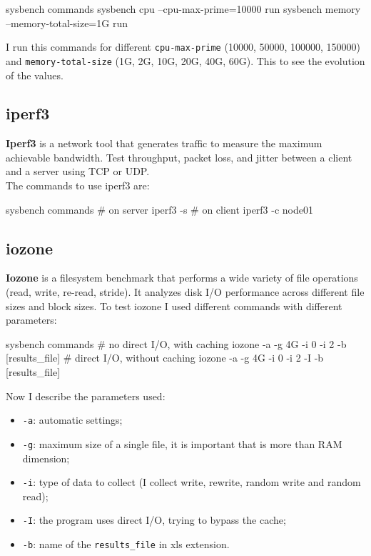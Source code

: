 \begin{codice}[style=bashstyle]{sysbench commands}
    sysbench cpu --cpu-max-prime=10000 run
    sysbench memory --memory-total-size=1G run
\end{codice}

I run this commands for different \texttt{cpu-max-prime} (10000, 50000, 100000, 150000) and \texttt{memory-total-size} (1G, 2G, 10G, 20G, 40G, 60G). This to see the evolution of the values.
\subsection{iperf3}
\textbf{Iperf3} is a network tool that generates traffic to measure the maximum achievable bandwidth. Test throughput, packet loss, and jitter between a client and a server using TCP or UDP. \\
The commands to use iperf3 are:

\begin{codice}[style=bashstyle]{sysbench commands}
    # on server
    iperf3 -s
    # on client
    iperf3 -c node01
\end{codice}

\subsection{iozone}
\textbf{Iozone} is a filesystem benchmark that performs a wide variety of file operations (read, write, re-read, stride). It analyzes disk I/O performance across different file sizes and block sizes.
To test iozone I used different commands with different parameters:

\begin{codice}[style=bashstyle]{sysbench commands}
    # no direct I/O, with caching
    iozone -a -g 4G -i 0 -i 2 -b [results_file]
    # direct I/O, without caching
    iozone -a -g 4G -i 0 -i 2 -I -b [results_file]
\end{codice}

Now I describe the parameters used:

\begin{itemize}
    \item \texttt{-a}: automatic settings;
    \item \texttt{-g}: maximum size of a single file, it is important that is more than RAM dimension;
    \item \texttt{-i}: type of data to collect (I collect write, rewrite, random write and random read);
    \item \texttt{-I}: the program uses direct I/O, trying to bypass the cache;
    \item \texttt{-b}: name of the \texttt{results\_file} in xls extension.
\end{itemize}

